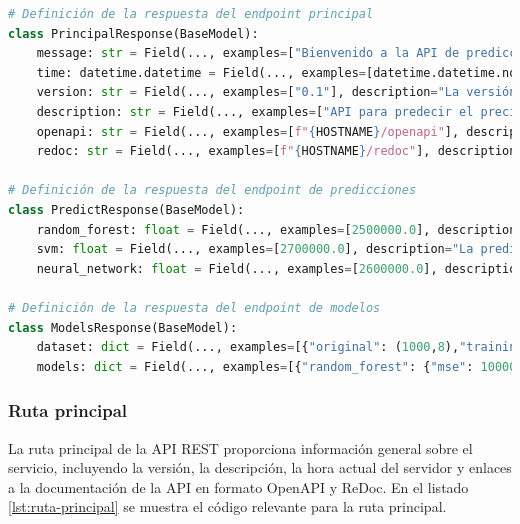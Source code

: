 \begin{lstlisting}[language=python, caption={API REST}, label={lst:api-rest}]
# Definición de la respuesta del endpoint principal
class PrincipalResponse(BaseModel):
    message: str = Field(..., examples=["Bienvenido a la API de predicción inmobiliaria"], description="Mensaje de bienvenida")
    time: datetime.datetime = Field(..., examples=[datetime.datetime.now()], description="La hora actual del servidor")
    version: str = Field(..., examples=["0.1"], description="La versión de la API")
    description: str = Field(..., examples=["API para predecir el precio de una propiedad"], description="Descripción de la API")
    openapi: str = Field(..., examples=[f"{HOSTNAME}/openapi"], description="Enlace a la documentación de la API")
    redoc: str = Field(..., examples=[f"{HOSTNAME}/redoc"], description="Enlace a la documentación de la API en formato ReDoc")

# Definición de la respuesta del endpoint de predicciones
class PredictResponse(BaseModel):
    random_forest: float = Field(..., examples=[2500000.0], description="La predicción del precio de la propiedad con el modelo Random Forest")
    svm: float = Field(..., examples=[2700000.0], description="La predicción del precio de la propiedad con el modelo SVM")
    neural_network: float = Field(..., examples=[2600000.0], description="La predicción del precio de la propiedad con el modelo de Redes Neuronales")

# Definición de la respuesta del endpoint de modelos
class ModelsResponse(BaseModel):
    dataset: dict = Field(..., examples=[{"original": (1000,8),"training": {"X": (1000, 8), "y": (1000, 1)}, "testing": {"X": (250, 8), "y": (250, 1)}}], description="Información sobre los datos de entrenamiento y prueba")
    models: dict = Field(..., examples=[{"random_forest": {"mse": 1000000000.0, "ci": (900000000.0, 1100000000.0), "mae": 30000.0, "r2": 0.9, "feature_importances": [0.1, 0.2, 0.3, 0.4, 0.0, 0.0, 0.0, 0.0], "max_features": "auto", "max_depth": 10, "n_estimators": 100, "oob_score": True}, "svm": {"mse": 1500000000.0, "ci": (1400000000.0, 1600000000.0), "mae": 40000.0, "r2": 0.8, "kernel": "rbf", "C": 1.0, "epsilon": 0.1}, "neural_network": {"mse": 2000000000.0, "ci": (1900000000.0, 2100000000.0), "mae": 50000.0, "r2": 0.7, "learning_rate": 0.001, "beta_1": 0.9, "beta_2": 0.999, "epsilon": 1e-07}}], description="Información sobre los modelos y sus características")
\end{lstlisting}

\subsubsection{Ruta principal}
La ruta principal de la API REST proporciona información general sobre el servicio,
incluyendo la versión, la descripción, la hora actual del servidor y enlaces a
la documentación de la API en formato OpenAPI y ReDoc. En el listado \ref{lst:ruta-principal}
se muestra el código relevante para la ruta principal.

